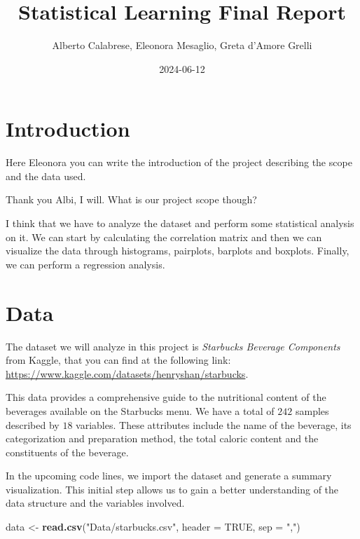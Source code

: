 \documentclass[
]{article}
\title{Statistical Learning Final Report}
\author{Alberto Calabrese, Eleonora Mesaglio, Greta d'Amore Grelli}
\date{2024-06-12}
\newenvironment{Shaded}{\begin{snugshade}}{\end{snugshade}}
\newcommand{\AttributeTok}[1]{\textcolor[rgb]{0.13,0.29,0.53}{#1}}
\newcommand{\ConstantTok}[1]{\textcolor[rgb]{0.56,0.35,0.01}{#1}}
\newcommand{\FunctionTok}[1]{\textcolor[rgb]{0.13,0.29,0.53}{\textbf{#1}}}
\newcommand{\NormalTok}[1]{#1}
\newcommand{\OtherTok}[1]{\textcolor[rgb]{0.56,0.35,0.01}{#1}}
\newcommand{\StringTok}[1]{\textcolor[rgb]{0.31,0.60,0.02}{#1}}
\begin{document}
\maketitle

{
\setcounter{tocdepth}{3}
\tableofcontents
}
\hypertarget{introduction}{%
\section{Introduction}\label{introduction}}

Here Eleonora you can write the introduction of the project describing
the scope and the data used.

Thank you Albi, I will. What is our project scope though?

I think that we have to analyze the dataset and perform some statistical
analysis on it. We can start by calculating the correlation matrix and
then we can visualize the data through histograms, pairplots, barplots
and boxplots. Finally, we can perform a regression analysis.

\hypertarget{data}{%
\section{Data}\label{data}}

The dataset we will analyze in this project is \emph{Starbucks Beverage
Components} from Kaggle, that you can find at the following link:
\url{https://www.kaggle.com/datasets/henryshan/starbucks}.

This data provides a comprehensive guide to the nutritional content of
the beverages available on the Starbucks menu. We have a total of
\(242\) samples described by \(18\) variables. These attributes include
the name of the beverage, its categorization and preparation method, the
total caloric content and the constituents of the beverage.

In the upcoming code lines, we import the dataset and generate a summary
visualization. This initial step allows us to gain a better
understanding of the data structure and the variables involved.

\begin{Shaded}
\begin{Highlighting}[]
\NormalTok{data }\OtherTok{\textless{}{-}} \FunctionTok{read.csv}\NormalTok{(}\StringTok{"Data/starbucks.csv"}\NormalTok{, }\AttributeTok{header =} \ConstantTok{TRUE}\NormalTok{, }\AttributeTok{sep =} \StringTok{","}\NormalTok{)}
\end{Highlighting}
\end{Shaded}
\end{document}
